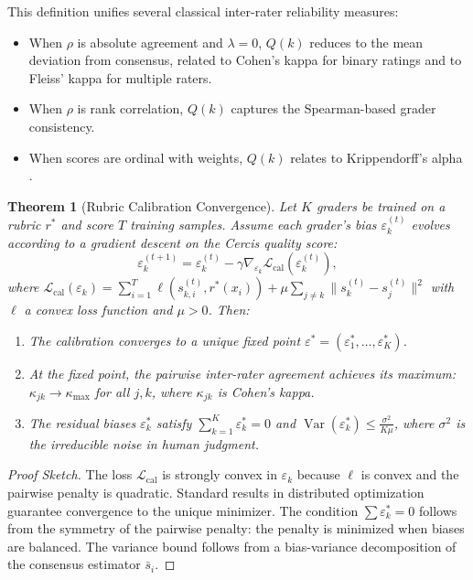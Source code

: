 \documentclass[12pt,a4paper]{article}
\newtheorem{theorem}{Theorem}[section]
\theoremstyle{remark}
\DeclareMathOperator{\Var}{Var}
\begin{document}
This definition unifies several classical inter-rater reliability measures:

\begin{itemize}
    \item When $\rho$ is absolute agreement and $\lambda = 0$, $Q(k)$ reduces to the mean deviation from consensus, related to Cohen's kappa \cite{cohen1960} for binary ratings and to Fleiss' kappa \cite{fleiss1971} for multiple raters.
    \item When $\rho$ is rank correlation, $Q(k)$ captures the Spearman-based grader consistency.
    \item When scores are ordinal with weights, $Q(k)$ relates to Krippendorff's alpha \cite{krippendorff2004}.
\end{itemize}

\begin{theorem}[Rubric Calibration Convergence]
\label{thm:calibration}
Let $K$ graders be trained on a rubric $r^*$ and score $T$ training samples. Assume each grader's bias $\varepsilon_k^{(t)}$ evolves according to a gradient descent on the Cercis quality score:
\begin{equation}
\varepsilon_k^{(t+1)} = \varepsilon_k^{(t)} - \gamma \nabla_{\varepsilon_k} \mathcal{L}_{\text{cal}}(\varepsilon_k^{(t)}),
\label{eq:calibration_update}
\end{equation}
where $\mathcal{L}_{\text{cal}}(\varepsilon_k) = \sum_{i=1}^T \ell(s_{k,i}^{(t)}, r^*(x_i)) + \mu \sum_{j \neq k} \|s_{k}^{(t)} - s_j^{(t)}\|^2$ with $\ell$ a convex loss function and $\mu > 0$. Then:
\begin{enumerate}
    \item The calibration converges to a unique fixed point $\varepsilon^* = (\varepsilon_1^*,\dots,\varepsilon_K^*)$.
    \item At the fixed point, the pairwise inter-rater agreement achieves its maximum: $\kappa_{jk} \to \kappa_{\max}$ for all $j,k$, where $\kappa_{jk}$ is Cohen's kappa.
    \item The residual biases $\varepsilon_k^*$ satisfy $\sum_{k=1}^K \varepsilon_k^* = 0$ and $\Var(\varepsilon_k^*) \leq \frac{\sigma^2}{K\mu}$, where $\sigma^2$ is the irreducible noise in human judgment.
\end{enumerate}
\end{theorem}

\begin{proof}[Proof Sketch]
The loss $\mathcal{L}_{\text{cal}}$ is strongly convex in $\varepsilon_k$ because $\ell$ is convex and the pairwise penalty is quadratic. Standard results in distributed optimization \cite{boyd2011} guarantee convergence to the unique minimizer. The condition $\sum \varepsilon_k^* = 0$ follows from the symmetry of the pairwise penalty: the penalty is minimized when biases are balanced. The variance bound follows from a bias-variance decomposition of the consensus estimator $\bar{s}_i$.
\end{proof}
\end{document}
